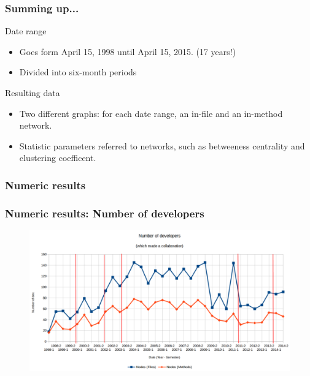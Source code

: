 \documentclass{beamer}
\begin{document}

\begin{frame}
\frametitle{Summing up...}
\begin{block}{Date range}
\begin{itemize}
\item Goes form April 15, 1998 until April 15, 2015. (17 years!)
\item Divided into six-month periods
\end{itemize}
\end{block}

\begin{block}{Resulting data}
\begin{itemize}
\item Two different graphs: for each date range, 
an in-file and an in-method network.
\item Statistic parameters referred to networks, such as betweeness centrality and clustering coefficent.
\end{itemize}
\end{block}

\end{frame}

\subsubsection{Numeric results}
\begin{frame}
\frametitle{Numeric results: Number of developers}
\begin{figure}
\includegraphics[scale=0.32]{chart1.png}
\label{fig:chartdev1}
\end{figure}
\end{frame}
\end{document}

